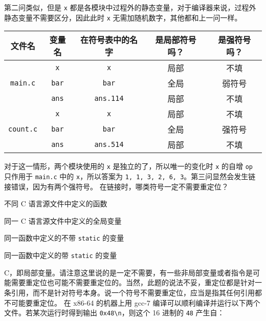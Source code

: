 \begin{problems}
        第二问类似，但是 \verb|x| 都是各模块中过程外的静态变量，对于编译器来说，过程外静态变量不需要区分，因此此时 \verb|x| 无需加随机数字，其他都和上一问一样。
        \begin{table}[H]
            \centering
            \begin{tabular}{|c|c|c|c|c|}
                \hline
                文件名 & 变量名 & 在符号表中的名字 & 是局部符号吗？ & 是强符号吗？ \\ \hline
                \multirow{3}{*}{\texttt{main.c}} & \texttt{x} & \verb|x| & 局部 & 不填 \\ \cline{2-5} 
                & \texttt{bar} & \verb|bar| & 全局 & 弱符号 \\ \cline{2-5} 
                & \texttt{ans} & \verb|ans.114| & 局部 & 不填 \\ \hline
                \multirow{3}{*}{\texttt{count.c}} & \texttt{x} & \verb|x| & 局部 & 不填 \\ \cline{2-5} 
                & \texttt{bar} & \verb|bar| & 全局 & 强符号 \\ \cline{2-5} 
                & \texttt{ans} & \verb|ans.514| & 局部 & 不填 \\ \hline
            \end{tabular}
        \end{table}
        对于这一情形，两个模块使用的 \verb|x| 是独立的了，所以唯一的变化时 \verb|x| 的自增 \verb|op| 只作用于 \verb|main.c| 中的 \verb|x|，所以答案为 \verb|1, 1, 3, 2, 6, 3|。第三问显然会发生链接错误，因为有两个强符号。
        \pro 在链接时，哪类符号一定不需要重定位？
        \begin{choices}
            \item 不同 C 语言源文件中定义的函数
            \item 同一 C 语言源文件中定义的全局变量
            \item 同一函数中定义的不带 \verb|static| 的变量
            \item 同一函数中定义的带 \verb|static| 的变量
        \end{choices}
        \sol C，即局部变量。请注意这里说的是一定不需要，有一些非局部变量或者指令是可能需要重定位也可能不需要重定位的。当然，此题的说法不妥，重定位都是针对一条引用，而不是针对符号本身。说一个符号不需要重定位，应当是指其任何引用都不可能要重定位。
        \pro 在 x86-64 的机器上用 gcc-7 编译可以顺利编译并运行以下两个文件。若某次运行时得到输出 \verb|0x48\n|，则这个 16 进制的 \verb|48| 产生自：
        \begin{verbatim}

\end{verbatim}
\end{problems}
